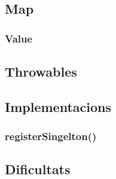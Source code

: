 
\subsection{Map}
\subsubsection{Value}
\subsection{Throwables}
\subsection{Implementacions}
\subsubsection{registerSingelton()}
\subsection{Dificultats}


